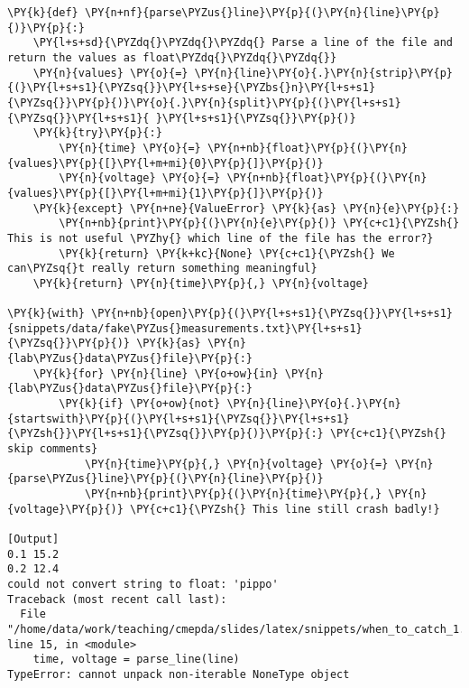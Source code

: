 \begin{Verbatim}[label=\makebox{\url{https://github.com/lucabaldini/cmepda/tree/master/slides/latex/snippets/when\_to\_catch\_1.py}},commandchars=\\\{\}]
\PY{k}{def} \PY{n+nf}{parse\PYZus{}line}\PY{p}{(}\PY{n}{line}\PY{p}{)}\PY{p}{:}
    \PY{l+s+sd}{\PYZdq{}\PYZdq{}\PYZdq{} Parse a line of the file and return the values as float\PYZdq{}\PYZdq{}\PYZdq{}}
    \PY{n}{values} \PY{o}{=} \PY{n}{line}\PY{o}{.}\PY{n}{strip}\PY{p}{(}\PY{l+s+s1}{\PYZsq{}}\PY{l+s+se}{\PYZbs{}n}\PY{l+s+s1}{\PYZsq{}}\PY{p}{)}\PY{o}{.}\PY{n}{split}\PY{p}{(}\PY{l+s+s1}{\PYZsq{}}\PY{l+s+s1}{ }\PY{l+s+s1}{\PYZsq{}}\PY{p}{)}
    \PY{k}{try}\PY{p}{:}
        \PY{n}{time} \PY{o}{=} \PY{n+nb}{float}\PY{p}{(}\PY{n}{values}\PY{p}{[}\PY{l+m+mi}{0}\PY{p}{]}\PY{p}{)}
        \PY{n}{voltage} \PY{o}{=} \PY{n+nb}{float}\PY{p}{(}\PY{n}{values}\PY{p}{[}\PY{l+m+mi}{1}\PY{p}{]}\PY{p}{)}
    \PY{k}{except} \PY{n+ne}{ValueError} \PY{k}{as} \PY{n}{e}\PY{p}{:}
        \PY{n+nb}{print}\PY{p}{(}\PY{n}{e}\PY{p}{)} \PY{c+c1}{\PYZsh{} This is not useful \PYZhy{} which line of the file has the error?}
        \PY{k}{return} \PY{k+kc}{None} \PY{c+c1}{\PYZsh{} We can\PYZsq{}t really return something meaningful}
    \PY{k}{return} \PY{n}{time}\PY{p}{,} \PY{n}{voltage}

\PY{k}{with} \PY{n+nb}{open}\PY{p}{(}\PY{l+s+s1}{\PYZsq{}}\PY{l+s+s1}{snippets/data/fake\PYZus{}measurements.txt}\PY{l+s+s1}{\PYZsq{}}\PY{p}{)} \PY{k}{as} \PY{n}{lab\PYZus{}data\PYZus{}file}\PY{p}{:}
    \PY{k}{for} \PY{n}{line} \PY{o+ow}{in} \PY{n}{lab\PYZus{}data\PYZus{}file}\PY{p}{:}
        \PY{k}{if} \PY{o+ow}{not} \PY{n}{line}\PY{o}{.}\PY{n}{startswith}\PY{p}{(}\PY{l+s+s1}{\PYZsq{}}\PY{l+s+s1}{\PYZsh{}}\PY{l+s+s1}{\PYZsq{}}\PY{p}{)}\PY{p}{:} \PY{c+c1}{\PYZsh{} skip comments}
            \PY{n}{time}\PY{p}{,} \PY{n}{voltage} \PY{o}{=} \PY{n}{parse\PYZus{}line}\PY{p}{(}\PY{n}{line}\PY{p}{)}
            \PY{n+nb}{print}\PY{p}{(}\PY{n}{time}\PY{p}{,} \PY{n}{voltage}\PY{p}{)} \PY{c+c1}{\PYZsh{} This line still crash badly!}

[Output]
0.1 15.2
0.2 12.4
could not convert string to float: 'pippo'
Traceback (most recent call last):
  File "/home/data/work/teaching/cmepda/slides/latex/snippets/when_to_catch_1.py", line 15, in <module>
    time, voltage = parse_line(line)
TypeError: cannot unpack non-iterable NoneType object
\end{Verbatim}
